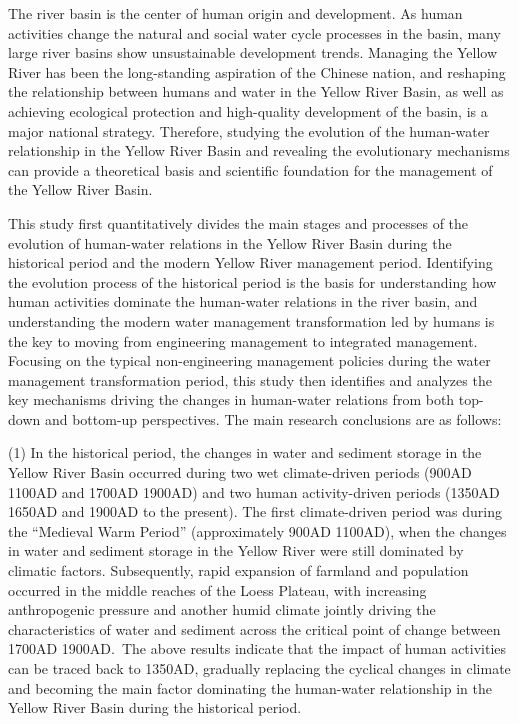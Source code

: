 \begin{eabstract}
  The river basin is the center of human origin and development. As human activities change the natural and social water cycle processes in the basin, many large river basins show unsustainable development trends. Managing the Yellow River has been the long-standing aspiration of the Chinese nation, and reshaping the relationship between humans and water in the Yellow River Basin, as well as achieving ecological protection and high-quality development of the basin, is a major national strategy. Therefore, studying the evolution of the human-water relationship in the Yellow River Basin and revealing the evolutionary mechanisms can provide a theoretical basis and scientific foundation for the management of the Yellow River Basin.

  This study first quantitatively divides the main stages and processes of the evolution of human-water relations in the Yellow River Basin during the historical period and the modern Yellow River management period. Identifying the evolution process of the historical period is the basis for understanding how human activities dominate the human-water relations in the river basin, and understanding the modern water management transformation led by humans is the key to moving from engineering management to integrated management.
  Focusing on the typical non-engineering management policies during the water management transformation period, this study then identifies and analyzes the key mechanisms driving the changes in human-water relations from both top-down and bottom-up perspectives. The main research conclusions are as follows:

  (1) In the historical period, the changes in water and sediment storage in the Yellow River Basin occurred during two wet climate-driven periods (900AD \textendash{} 1100AD and 1700AD \textendash{} 1900AD) and two human activity-driven periods (1350AD \textendash{} 1650AD and 1900AD to the present). The first climate-driven period was during the ``Medieval Warm Period'' (approximately 900AD \textendash{} 1100AD), when the changes in water and sediment storage in the Yellow River were still dominated by climatic factors. Subsequently, rapid expansion of farmland and population occurred in the middle reaches of the Loess Plateau, with increasing anthropogenic pressure and another humid climate jointly driving the characteristics of water and sediment across the critical point of change between 1700AD \textendash{} 1900AD.\ The above results indicate that the impact of human activities can be traced back to 1350AD, gradually replacing the cyclical changes in climate and becoming the main factor dominating the human-water relationship in the Yellow River Basin during the historical period.


\end{eabstract}
